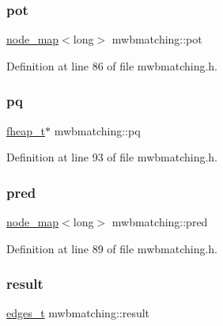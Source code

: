 \subsubsection{\texorpdfstring{pot}{pot}}
{\footnotesize\ttfamily \mbox{\hyperlink{classnode__map}{node\+\_\+map}}$<$long$>$ mwbmatching\+::pot\hspace{0.3cm}{\ttfamily [protected]}}



Definition at line 86 of file mwbmatching.\+h.

\mbox{\label{classmwbmatching_adeeeb1d1bc49ead5bce740bde6ae52bf}} 
\subsubsection{\texorpdfstring{pq}{pq}}
{\footnotesize\ttfamily \mbox{\hyperlink{fheap_8h_a81491fcb8cde3f99611815852e42a9ad}{fheap\+\_\+t}}$\ast$ mwbmatching\+::pq\hspace{0.3cm}{\ttfamily [protected]}}



Definition at line 93 of file mwbmatching.\+h.

\mbox{\label{classmwbmatching_acea3c6ca4ec946e87a2850c2dc20479f}} 
\subsubsection{\texorpdfstring{pred}{pred}}
{\footnotesize\ttfamily \mbox{\hyperlink{classnode__map}{node\+\_\+map}}$<$long$>$ mwbmatching\+::pred\hspace{0.3cm}{\ttfamily [protected]}}



Definition at line 89 of file mwbmatching.\+h.

\mbox{\label{classmwbmatching_aa6483fb0f23c87f29bb08f7abff80144}} 
\subsubsection{\texorpdfstring{result}{result}}
{\footnotesize\ttfamily \mbox{\hyperlink{edge_8h_a8f9587479bda6cf612c103494b3858e3}{edges\+\_\+t}} mwbmatching\+::result\hspace{0.3cm}{\ttfamily [protected]}}



